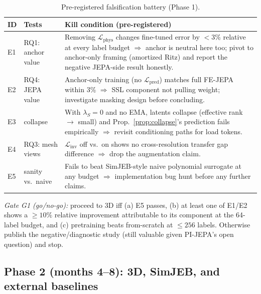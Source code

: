 \documentclass[11pt]{article}
\begin{document}
\begin{table}[h]
\centering
\small
\begin{tabular}{@{}llp{6.6cm}@{}}
\toprule
\textbf{ID} & \textbf{Tests} & \textbf{Kill condition (pre-registered)}\\
\midrule
E1 & RQ1: anchor value & Removing $\mathcal{L}_{\mathrm{phys}}$ changes
fine-tuned error by $<3\%$ relative at every label budget
$\Rightarrow$ anchor is neutral here too; pivot to anchor-only framing
(amortized Ritz) and report the negative JEPA-side result honestly.\\
E2 & RQ4: JEPA value & Anchor-only training (no $\mathcal{L}_{\mathrm{pred}}$)
matches full FE-JEPA within 3\% $\Rightarrow$ SSL component not pulling
weight; investigate masking design before concluding.\\
E3 & collapse & With $\lambda_S{=}0$ and no EMA, latents collapse
(effective rank $\to$ small) and Prop.~\ref{prop:collapse}'s prediction
fails empirically $\Rightarrow$ revisit conditioning paths for load tokens.\\
E4 & RQ3: mesh views & $\mathcal{L}_{\mathrm{inv}}$ off vs.\ on shows no
cross-resolution transfer gap difference $\Rightarrow$ drop the
augmentation claim.\\
E5 & sanity vs.\ naive & Fails to beat SimJEB-style naive polynomial
surrogate \cite{whalen2021simjeb} at any budget $\Rightarrow$ implementation
bug hunt before any further claims.\\
\bottomrule
\end{tabular}
\caption{Pre-registered falsification battery (Phase 1).}
\label{tab:falsify}
\end{table}

\emph{Gate G1 (go/no-go):} proceed to 3D iff (a) E5 passes, (b) at least one
of E1/E2 shows a $\ge 10\%$ relative improvement attributable to its
component at the 64-label budget, and (c) pretraining beats from-scratch at
$\le 256$ labels. Otherwise publish the negative/diagnostic study (still
valuable given PI-JEPA's open question) and stop.

\subsection{Phase 2 (months 4--8): 3D, SimJEB, and external baselines}
\end{document}

